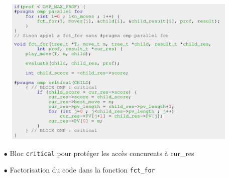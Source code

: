 \documentclass[usepdftitle=false,green]{beamer}
\begin{document}
\begin{frame}
    \begin{center}
        \begin{figure}
            \includegraphics[scale=0.2]{pics/code2.png}
        \end{figure}
        \begin{itemize}
            \item[$\bullet$] Bloc \texttt{critical} pour protéger les accès concurents à cur\_res
            \item[$\bullet$] Factorisation du code dans la fonction \texttt{fct\_for}
        \end{itemize}
    \end{center}
\end{frame}
\end{document}
